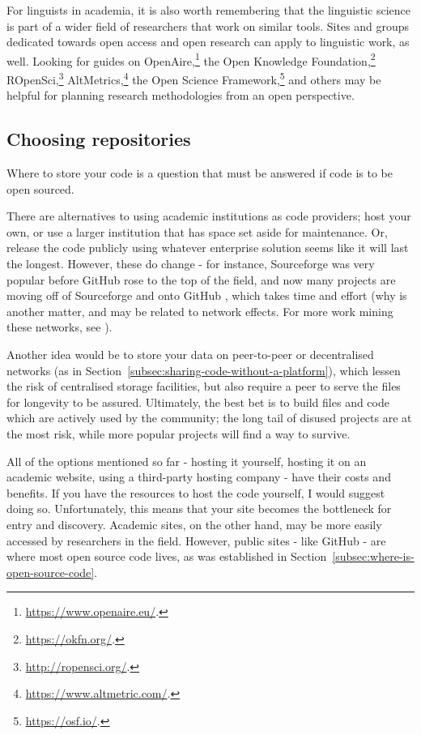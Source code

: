 For linguists in academia, it is also worth remembering that the linguistic science is part of a wider field of researchers that work on similar tools. Sites and groups dedicated towards open access and open research can apply to linguistic work, as well. Looking for guides on OpenAire,\footnote{\href{https://www.openaire.eu/}{https://www.openaire.eu/}. } the Open Knowledge Foundation,\footnote{\href{https://okfn.org/}{https://okfn.org/}. } ROpenSci,\footnote{\href{http://ropensci.org/}{http://ropensci.org/}. } AltMetrics,\footnote{\href{https://www.altmetric.com/}{https://www.altmetric.com/}. } the Open Science Framework,\footnote{\href{https://osf.io/}{https://osf.io/}. } and others may be helpful for planning research methodologies from an open perspective.

\subsection{Choosing repositories}
\label{choosing-repositories}

Where to store your code is a question that must be answered if code is to be open sourced.

There are alternatives to using academic institutions as code providers; host your own, or use a larger institution that has space set aside for maintenance. Or, release the code publicly using whatever enterprise solution seems like it will last the longest. However, these do change - for instance, Sourceforge was very popular before GitHub rose to the top of the field, and now many projects are moving off of Sourceforge and onto GitHub \citep{finley2011github}, which takes time and effort (why is another matter, and may be related to network effects. For more work mining these networks, see \citet{thung2013network, kalliamvakou2014promises}).

Another idea would be to store your data on peer-to-peer or decentralised networks (as in Section~\ref{subsec:sharing-code-without-a-platform}), which lessen the risk of centralised storage facilities, but also require a peer to serve the files for longevity to be assured. Ultimately, the best bet is to build files and code which are actively used by the community; the long tail of disused projects are at the most risk, while more popular projects will find a way to survive.

All of the options mentioned so far - hosting it yourself, hosting it on an academic website, using a third-party hosting company - have their costs and benefits. If you have the resources to host the code yourself, I would suggest doing so. Unfortunately, this means that your site becomes the bottleneck for entry and discovery. Academic sites, on the other hand, may be more easily accessed by researchers in the field. However, public sites - like GitHub - are where most open source code lives, as was established in Section~\ref{subsec:where-is-open-source-code}.

